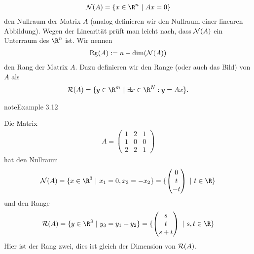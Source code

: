 \documentclass[letterpaper,10pt,english]{jupyterBook}
\begin{document}
\begin{equation*}
\begin{split} {\cal N}(A) = \{ x \in \R^n ~|~ Ax = 0 \}\end{split}
\end{equation*}
den Nullraum der Matrix \(A\) (analog definieren wir den Nullraum einer linearen Abbildung). Wegen der Linearität prüft man leicht nach, dass \({\cal N}(A)\) ein Unterraum des \(\R^n\) ist. Wir nennen
\begin{equation*}
\begin{split} \text{Rg}(A) := n - \text{dim}({\cal N}(A))\end{split}
\end{equation*}
den Rang der Matrix \(A\). Dazu definieren wir den Range (oder auch das Bild) von \(A\) als
\begin{equation*}
\begin{split} {\cal R}(A) = \{ y \in \R^m~|~\exists x \in \R^N: y = Ax\}.\end{split}
\end{equation*}\label{vektorraeume/LGS:example-0}
\begin{sphinxadmonition}{note}{Example 3.12}



Die Matrix
\begin{equation*}
\begin{split} A = \left(\begin{matrix} 1 & 2 & 1 \\ 1 & 0 & 0  \\ 2 & 2 & 1  \end{matrix} \right)\end{split}
\end{equation*}
hat den Nullraum
\begin{equation*}
\begin{split} {\cal N}(A) = \{ x \in \R^3 ~|~x_1=0, x_3= -x_2\} =\{ \left(\begin{matrix} 0 \\ t  \\ -t  \end{matrix} \right) ~|~ t \in \R\}\end{split}
\end{equation*}
und den Range
\begin{equation*}
\begin{split} {\cal R}(A) = \{ y \in \R^3~|~y_3 = y_1 + y_2\}=\{ \left(\begin{matrix} s \\ t  \\ s+t  \end{matrix} \right) ~|~ s,t \in \R\}\end{split}
\end{equation*}
Hier ist der Rang zwei, dies ist gleich der Dimension von \({\cal R}(A)\).
\end{sphinxadmonition}
\end{document}
